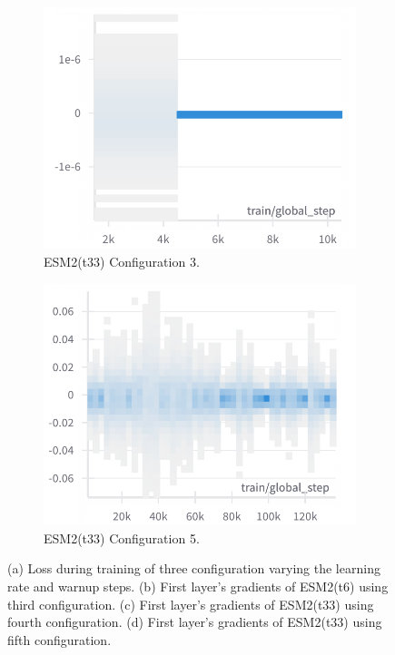 \begin{figure}[h]
\begin{subfigure}[b]{0.45\textwidth}
		\includegraphics[width=\textwidth]{../img/results/t33_c3_gradients}
		\caption{ESM2(t33) Configuration 3.}
		\label{fig:t33_c3_gradients}
	\end{subfigure}
	\hfill
	\begin{subfigure}[b]{0.45\textwidth}
		\centering
		\includegraphics[width=\textwidth]{../img/results/t33_c5_gradients}
		\caption{ESM2(t33) Configuration 5.}
		\label{fig:t33_c5_gradients}
	\end{subfigure}
	
	
	\caption{(a) Loss during training of three configuration varying the learning rate and warnup steps. (b) First layer's gradients of ESM2(t6) using third configuration. (c) First layer's gradients of ESM2(t33) using fourth configuration. (d) First layer's gradients of ESM2(t33) using fifth  configuration.}
	\label{fig:training}
\end{figure}


